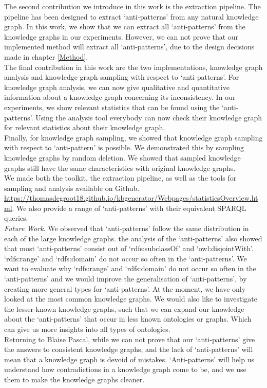\documentclass[11pt,letterpaper ,oneside ]{book}
\begin{document}
	The second contribution we introduce in this work is the extraction pipeline. The pipeline has been designed to extract `anti-patterns' from any natural knowledge graph. In this work, we show that we can extract all `anti-patterns' from the knowledge graphs in our experiments. However, we can not prove that our implemented method will extract all `anti-patterns', due to the design decisions made in chapter \ref{Method}.\\ 
	
	The final contribution in this work are the two implementations, knowledge graph analysis and knowledge graph sampling with respect to `anti-patterns'. For knowledge graph analysis, we can now give qualitative and quantitative information about a knowledge graph concerning its inconsistency. In our experiments, we show relevant statistics that can be found using the `anti-patterns'. Using the analysis tool everybody can now check their knowledge graph for relevant statistics about their knowledge graph. \\
	
	Finally, for knowledge graph sampling, we showed that knowledge graph sampling with respect to `anti-pattern' is possible. We demonstrated this by sampling knowledge graphs by random deletion. We showed that sampled knowledge graphs still have the same characteristics with original knowledge graphs.\\
	
	We made both the toolkit, the extraction pipeline, as well as the tools for sampling and analysis available on Github. \\ \url{https://thomasdegroot18.github.io/kbgenerator/Webpages/statisticsOverview.html}. We also provide a range of `anti-patterns' with their equivalent SPARQL queries.\\
	\textit{Future Work}. We observed that `anti-patterns' follow the same distribution in each of the large knowledge graphs. the analysis of the `anti-patterns' also showed that most `anti-patterns' consist out of `rdfs:subclassOf' and `owl:disjointWith'. `rdfs:range' and `rdfs:domain' do not occur so often in the `anti-patterns'.
	We want to evaluate why `rdfs:range' and `rdfs:domain' do not occur so often in the `anti-patterns' and we would improve the generalisation of `anti-patterns', by creating more general types for `anti-patterns'. At the moment, we have only looked at the most common knowledge graphs. We would also like to investigate the lesser-known knowledge graphs, such that we can expand our knowledge about the `anti-patterns' that occur in less known ontologies or graphs. Which can give us more insights into all types of ontologies.\\
	
	Returning to Blaise Pascal, while we can not prove that our `anti-patterns' give the answers to consistent knowledge graphs, and the lack of `anti-patterns' will mean that a knowledge graph is devoid of mistakes. `Anti-patterns' will help us understand how contradictions in a knowledge graph come to be, and we use them to make the knowledge graphs cleaner.
	
	\newpage
	
	
	
	
\end{document}
